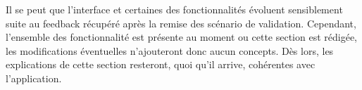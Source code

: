 Il se peut que l'interface et certaines des fonctionnalités évoluent sensiblement suite au feedback récupéré après la remise des scénario de validation. Cependant, l'ensemble des fonctionnalité est présente au moment ou cette section est rédigée, les modifications éventuelles n'ajouteront donc aucun concepts. Dès lors, les explications de cette section resteront, quoi qu'il arrive,  cohérentes avec l'application.







